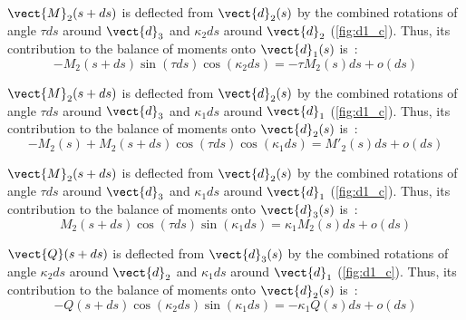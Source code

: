 $\vect{M}_2(s+ds)$ is deflected from $\vect{d}_2(s)$ by the combined rotations of angle $\tau ds$ around $\vect{d}_3$ and $\kappa_2 ds$ around $\vect{d}_2$ (\cref{fig:d1_c}). Thus, its contribution to the balance of moments onto $\vect{d}_1(s)$ is~:
\begin{equation*}
	-M_2(s+ds) \sin(\tau ds) \cos(\kappa_2 ds) = -\tau M_2 (s) ds + o(ds)
\end{equation*}

$\vect{M}_2(s+ds)$ is deflected from $\vect{d}_2(s)$ by the combined rotations of angle $\tau ds$ around $\vect{d}_3$ and $\kappa_1 ds$ around $\vect{d}_1$ (\cref{fig:d1_c}). Thus, its contribution to the balance of moments onto $\vect{d}_2(s)$ is~:
\begin{equation*}
	-M_2(s) + M_2(s+ds) \cos(\tau ds) \cos(\kappa_1 ds) = M'_2 (s) ds + o(ds)
\end{equation*}

$\vect{M}_2(s+ds)$ is deflected from $\vect{d}_2(s)$ by the combined rotations of angle $\tau ds$ around $\vect{d}_3$ and $\kappa_1 ds$ around $\vect{d}_1$ (\cref{fig:d1_c}). Thus, its contribution to the balance of moments onto $\vect{d}_3(s)$ is~:
\begin{equation*}
	M_2(s+ds) \cos(\tau ds) \sin(\kappa_1 ds) = \kappa_1 M_2 (s) ds + o(ds)
\end{equation*}

$\vect{Q}(s+ds)$ is deflected from $\vect{d}_3(s)$ by the combined rotations of angle $\kappa_2 ds$ around $\vect{d}_2$ and $\kappa_1 ds$ around $\vect{d}_1$ (\cref{fig:d1_c}). Thus, its contribution to the balance of moments onto $\vect{d}_2(s)$ is~:
\begin{equation*}
	-Q(s+ds) \cos(\kappa_2 ds) \sin(\kappa_1 ds) = -\kappa_1 Q(s) ds + o(ds)
\end{equation*}

\clearpage\hbox{}


